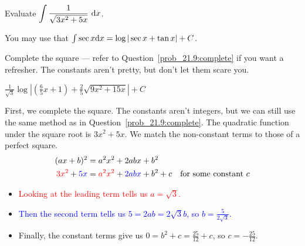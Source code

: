 \begin{Mquestion}
Evaluate $\displaystyle\int \dfrac{1}{\sqrt{3x^2+5x}}~\mathrm{d}x$.

You may use that  $\int \sec x\mathrm{d}x = \log|\sec x+\tan x| +C$.
\end{Mquestion}
\begin{hint}
Complete the square --- refer to Question~\ref{prob_21.9:complete} if you want a refresher. The constants aren't pretty, but don't let them scare you.
\end{hint}
\begin{answer}
$\displaystyle\frac{1}{\sqrt{3}}\log\left| \left(\frac{6}{5}x+1\right)+\frac{2}{5}\sqrt{9x^2+15x} \right|+C$
\end{answer}
\begin{solution}
First, we complete the square. The constants aren't integers, but we can still use the same method as in Question~\ref{prob_21.9:complete}.
The quadratic function under the square root is $3x^2+5x$. We match the non-constant terms to those of a perfect square.
\begin{align*}
(ax+b)^2&=a^2x^2+2abx+b^2\\
\textcolor{red}{3x^2}+\textcolor{blue}{5x}&=\textcolor{red}{a^2x^2} + \textcolor{blue}{2abx} +b^2 + c \quad\mbox{for some constant $c$}
\end{align*}
\begin{itemize}
\item \textcolor{red}{Looking at the leading term tells us $a=\sqrt{3}$. }
\item \textcolor{blue}{Then the second term tells us $5=2ab=2\sqrt{3}b$, so $b=\frac{5}{2\sqrt3}$.}
\item Finally, the constant terms give us $0=b^2+c=\frac{25}{12}+c$, so $c=-\frac{25}{12}$.
\end{itemize}


\end{solution}
